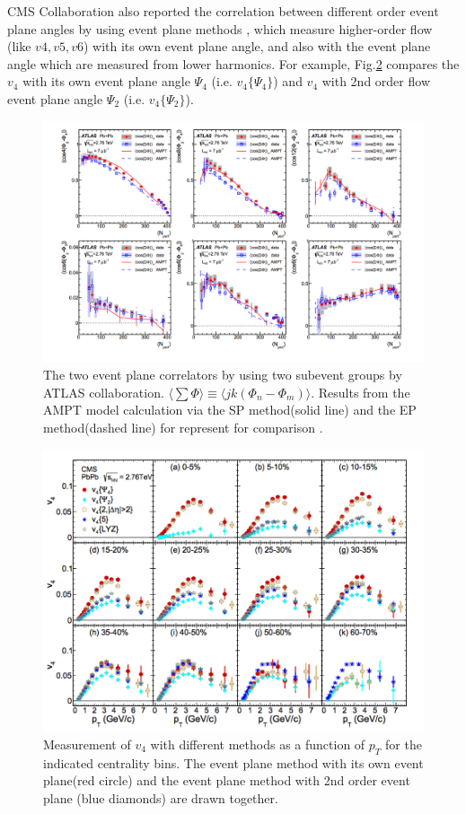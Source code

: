  CMS Collaboration also reported the correlation between different order event plane angles by using event plane methods \cite{Chatrchyan:2013kba}, which measure higher-order flow (like $v4, v5, v6$) with its own event plane angle, and also with the event plane angle which are measured from lower harmonics. For example, Fig.\ref{fig:cmsevtp} compares the $v_4$ with its own event plane angle $\Psi_4$ (i.e. $v_4\{\Psi_4\}$) and $v_4$ with 2nd order flow event plane angle $\Psi_2$ (i.e. $v_4\{ \Psi_2 \}$). 

\begin{figure}[h]
\centerline{\includegraphics[width=12.0cm]{figures/atlas_eventcorr}}
\caption{ The two event plane correlators by using two subevent groups by ATLAS collaboration. $\langle \sum \Phi \rangle \equiv \langle jk(\Phi_n - \Phi_m) \rangle$.  Results from the AMPT model calculation via the SP method(solid line) and the EP method(dashed line) for represent for comparison \cite{Aad:2014fla}.} 
\label{fig:atlas}
\end{figure}


\begin{figure}[h]
\centerline{\includegraphics[width=12.0cm]{figures/cms_vn_evt}}
\caption{ Measurement of $v_4$ with different methods as a function of $p_T$ for the indicated centrality bins. The event plane method with its own event plane(red circle) and the event plane method with 2nd order event plane (blue diamonds) are drawn together.\cite{Chatrchyan:2013kba} } 
\label{fig:cmsevtp}
\end{figure}

